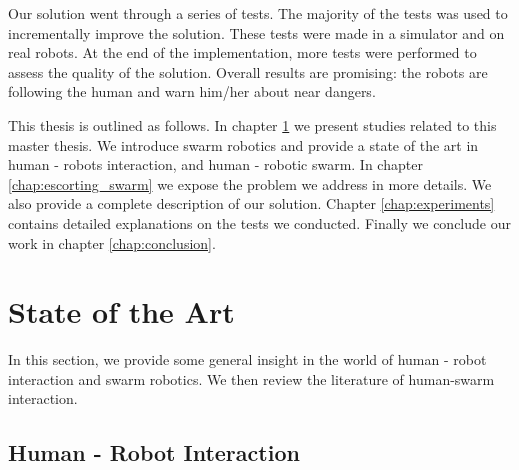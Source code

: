 \documentclass[oneside, a4paper, 12pt]{memoir}
\begin{document}
	Our solution went through a series of tests. The majority of the tests was used to incrementally improve the solution. These tests were made in a simulator and on real robots. At the end of the implementation, more tests were performed to assess the quality of the solution. Overall results are promising: the robots are following the human and warn him/her about near dangers.%
	
	This thesis is outlined as follows. In chapter \ref{chap:state_of_the_art} we present studies related to this master thesis. We introduce swarm robotics and provide a state of the art in human - robots interaction, and human - robotic swarm. In chapter \ref{chap:escorting_swarm} we expose the problem we address in more details. We also provide a complete description of our solution. Chapter \ref{chap:experiments} contains detailed explanations on the tests we conducted. Finally we conclude our work in chapter \ref{chap:conclusion}.

\chapter{State of the Art}
	\label{chap:state_of_the_art}

	In this section, we provide some general insight in the world of human - robot interaction and swarm robotics. We then review the literature of human-swarm interaction.
	
	\section{Human - Robot Interaction}

		
\end{document}
